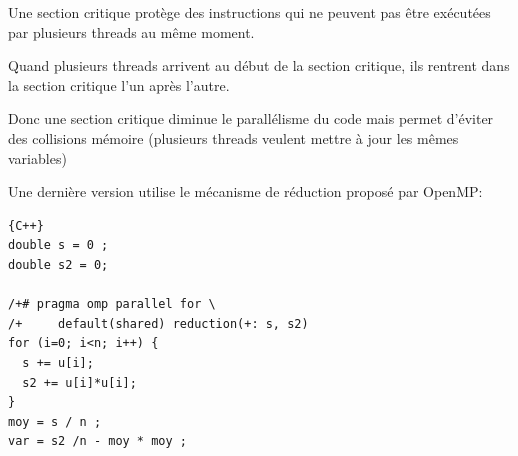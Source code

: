 \documentclass{beamer}
\begin{document}
\begin{frame}
	Une section critique protège des instructions qui ne peuvent pas être exécutées par plusieurs threads au même moment.
	
	\bigskip
	Quand plusieurs threads arrivent au début de la section critique, ils rentrent dans la section critique l'un après l'autre. 
	
	\bigskip
	Donc une section critique diminue le parallélisme du code mais permet d'éviter des collisions mémoire (plusieurs threads veulent mettre à jour les mêmes variables)
\end{frame}

\begin{frame}[fragile]
Une dernière version utilise le mécanisme de réduction proposé par OpenMP:

\begin{lstlisting}{C++}
double s = 0 ;
double s2 = 0;

/+# pragma omp parallel for \
/+     default(shared) reduction(+: s, s2)
for (i=0; i<n; i++) {
  s += u[i];
  s2 += u[i]*u[i];
}
moy = s / n ; 
var = s2 /n - moy * moy ;
\end{lstlisting}
\end{frame}
\end{document}
